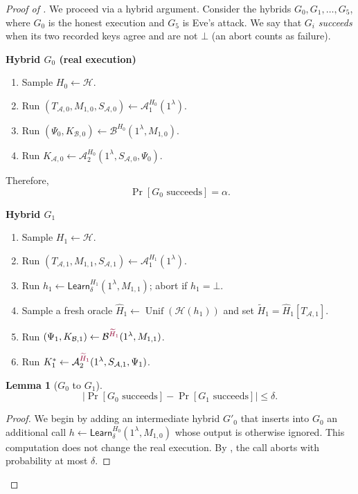 \documentclass[11pt]{article}
\newtheorem{lemma}[lemma]{Lemma}
\newcommand{\cA}{\mathcal{A}}
\newcommand{\cB}{\mathcal{B}}
\newcommand{\cH}{\mathcal{H}}
\newcommand{\Unif}{\operatorname{Unif}}
\newcommand{\Learn}{\mathsf{Learn}}
\newcommand{\changed}[1]{\textcolor{purple!75!black}{#1}}
\newenvironment{hybrid}[1]{%
  \par\medskip
  \noindent\textbf{#1}
  \begin{enumerate}[leftmargin=2.5em,label=\arabic*.,itemsep=0.25em,topsep=0.35em]
}{%
  \end{enumerate}
  \medskip
}
\begin{document}
\begin{proof}[Proof of ]
We proceed via a hybrid argument. Consider the hybrids \(G_0,G_1,\ldots,G_5\), where $G_0$ is the honest
execution and $G_5$ is Eve's attack. We say that \(G_i\) \emph{succeeds} when
its two recorded keys agree and are not \(\bot\) (an abort counts as failure).

\begin{hybrid}{Hybrid \(G_0\) (real execution)}
  \item Sample \(H_0\leftarrow\cH\).
  \item Run
  \((T_{\cA,0},M_{1,0},S_{\cA,0})
  \leftarrow\cA_1^{H_0}(1^\lambda)\).
  \item Run
  \((\Psi_0,K_{\cB,0})
  \leftarrow\cB^{H_0}(1^\lambda,M_{1,0})\).
  \item Run
  \(K_{\cA,0}
  \leftarrow\cA_2^{H_0}(1^\lambda,S_{\cA,0},\Psi_0)\).
\end{hybrid}
Therefore,
\[
  \Pr[G_0\text{ succeeds}]=\alpha.
\]

\begin{hybrid}{Hybrid \(G_1\)}
  \item Sample \(H_1\leftarrow\cH\).
  \item Run
  \((T_{\cA,1},M_{1,1},S_{\cA,1})
  \leftarrow\cA_1^{H_1}(1^\lambda)\).
  \item \changed{Run
  \(h_1\leftarrow\Learn_\delta^{H_1}(1^\lambda,M_{1,1})\); abort if
  \(h_1=\bot\).}
  \item \changed{Sample a fresh oracle
  \(\widehat H_1\leftarrow\Unif(\cH(h_1))\) and set
  \(\widetilde H_1=\widehat H_1[T_{\cA,1}]\).}
  \item Run
  \((\Psi_1,K_{\cB,1})
  \leftarrow\cB^{\changed{\widetilde H_1}}(1^\lambda,M_{1,1})\).
  \item Run
  \(K^*_1
  \leftarrow\cA_2^{\changed{\widetilde H_1}}
  (1^\lambda,S_{\cA,1},\Psi_1)\). 
\end{hybrid}

\begin{lemma}[\(G_0\) to \(G_1\)]\label{lem:g0-g1}
\[
  \left|
  \Pr[G_0\text{ succeeds}]
  -
  \Pr[G_1\text{ succeeds}]
  \right|
  \le\delta.
\]
\end{lemma}

\begin{proof}
We begin by adding an intermediate hybrid \(G'_0\) that inserts into \(G_0\) an additional call
\(h\leftarrow\Learn_\delta^{H_0}(1^\lambda,M_{1,0})\) whose output is otherwise
ignored. This computation does
not change the real execution. By
, the call aborts with probability at most
\(\delta\).


\end{proof}
\end{proof}
\end{document}
